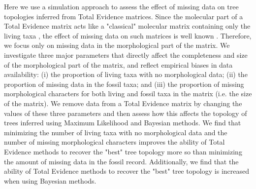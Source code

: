 \documentclass[12pt,letterpaper]{article}
\begin{document}
Here we use a simulation approach to assess the effect of missing data on tree topologies inferred from Total Evidence matrices. Since the molecular part of a Total Evidence matrix acts like a "classical" molecular matrix containing only the living taxa \citep{ronquista2012}, the effect of missing data on such matrices is well known \citep{wiensmissing2006,wiensmissing2008,lemmonthe2009,rouresite-specific2011}.
Therefore, we focus only on missing data in the morphological part of the matrix. We investigate three major parameters that directly affect the completeness and size of the morphological part of the matrix, and reflect empirical biases in data availability: (i) the proportion of living taxa with no morphological data; (ii) the proportion of missing data in the fossil taxa; and (iii) the proportion of missing morphological characters for both living and fossil taxa in the matrix (i.e. the size of the matrix). We remove data from a Total Evidence matrix by changing the values of these three parameters and then assess how this affects the topology of trees inferred using Maximum Likelihood and Bayesian methods. We find that minimizing the number of living taxa with no morphological data and the number of missing morphological characters improves the ability of Total Evidence methods to recover the "best" tree topology more so than minimizing the amount of missing data in the fossil record. Additionally, we find that the ability of Total Evidence methods to recover the "best" tree topology is increased when using Bayesian methods.
\end{document}

